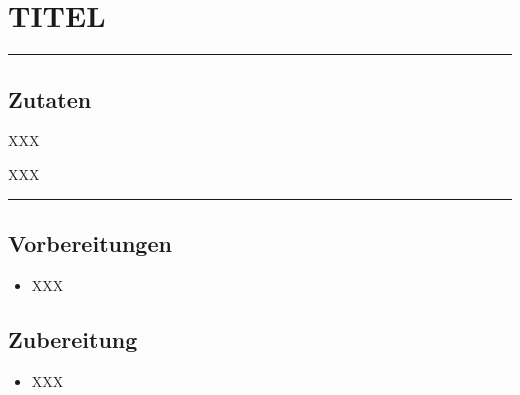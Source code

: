 \section*{TITEL}

\bigbreak
\rule{\textwidth}{0.4pt}

\subsection*{Zutaten}

\setlength{\columnseprule}{0pt}
\setlength{\columnsep}{1.5em}
\begin{multicols}{2}

    \begin{description}[align=right,leftmargin=!,labelwidth=\widthof{\bfseries xxPrisen}]
        \item[] XXX
    \end{description}

\columnbreak

    \begin{description}[align=right,leftmargin=!,labelwidth=\widthof{\bfseries xxPrisen}]
        \item[] XXX
    \end{description}

\vspace*{\fill}
\end{multicols}


\rule{\textwidth}{0.4pt}


\subsection*{Vorbereitungen}

\begin{itemize}
    \item XXX
\end{itemize}


\bigbreak
\subsection*{Zubereitung}

\begin{itemize}
    \item XXX
\end{itemize}


